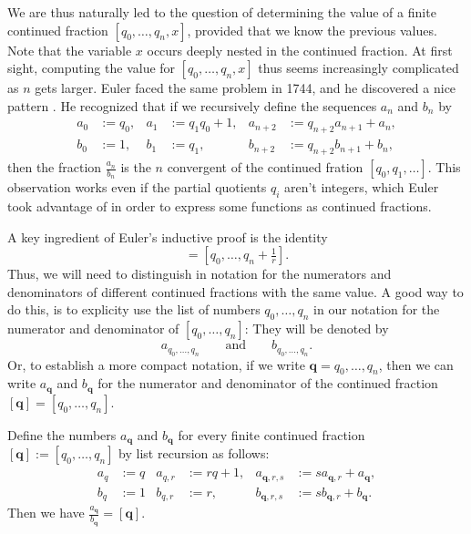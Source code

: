 We are thus naturally led to the question of determining the value of a finite continued fraction $[q_0,\ldots,q_n,x]$, provided that we know the previous values. Note that the variable $x$ occurs deeply nested in the continued fraction. At first sight, computing the value for $[q_0,\ldots,q_n,x]$ thus seems increasingly complicated as $n$ gets larger. Euler faced the same problem in 1744, and he discovered a nice pattern \cite[art.~7]{euler1744}. He recognized that if we recursively define the sequences $a_n$ and $b_n$ by
\begin{align*}
  a_0 & := q_0, & a_1 & := q_1q_0 + 1, & a_{n+2} & := q_{n+2}a_{n+1}+a_n, \\
  b_0 & := 1, & b_1 & := q_1, & b_{n+2} & := q_{n+2}b_{n+1}+b_n,
\end{align*}
then the fraction $\frac{a_n}{b_n}$ is the $n$\supth{} convergent of the continued fration $[q_0,q_1,\ldots]$. This observation works even if the partial quotients $q_i$ aren't integers, which Euler took advantage of in order to express some functions as continued fractions.

A key ingredient of Euler's inductive proof is the identity
\begin{equation*}
  [q_0,\ldots,q_n,r]=[q_0,\ldots,q_n+\tfrac{1}{r}].
\end{equation*}
Thus, we will need to distinguish in notation for the numerators and denominators of different continued fractions with the same value. A good way to do this, is to explicity use the list of numbers $q_0,\ldots,q_n$ in our notation for the numerator and denominator of $[q_0,\ldots,q_n]$: They will be denoted by
\begin{equation*}
  a_{q_0,\ldots,q_n}\qquad\text{and}\qquad b_{q_0,\ldots,q_n}.
\end{equation*}
Or, to establish a more compact notation, if we write $\symbf{q}=q_0,\ldots,q_n$, then we can write $a_{\symbf{q}}$ and $b_{\symbf{q}}$ for the numerator and denominator of the continued fraction $[\symbf{q}]=[q_0,\ldots,q_n]$.

\begin{theorem}\label{theorem:recurrence-theorem-convergents}
  Define the numbers $a_{\symbf{q}}$ and $b_{\symbf{q}}$ for every finite continued fraction $[\symbf{q}]:=[q_0,\ldots,q_n]$ by list recursion as follows:
  \begin{align*}
    a_q & := q & a_{q,r} & := rq + 1, & a_{\symbf{q},r,s} & := sa_{\symbf{q},r}+a_{\symbf{q}}, \\
    b_{q} & := 1 & b_{q,r} & := r, & b_{\symbf{q},r,s} & := sb_{\symbf{q},r}+b_{\symbf{q}}.
  \end{align*}
  Then we have $\frac{a_{\symbf{q}}}{b_{\symbf{q}}}=[\symbf{q}]$.
\end{theorem}

